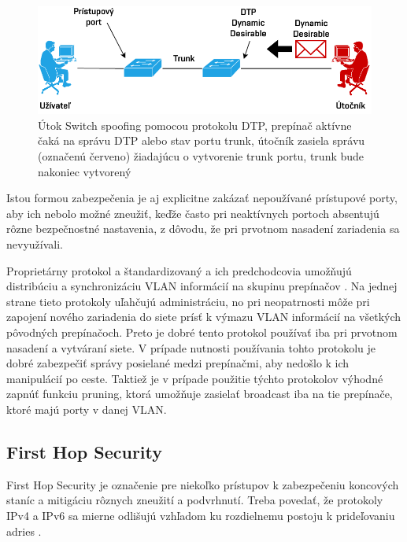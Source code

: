 \begin{figure}[H]
	\begin{center}
		\includegraphics[scale=0.75]{obrazky/switch-spoofing.pdf}
	\end{center}
	\caption[Útok Switch spoofing pomocou protokolu DTP]{Útok Switch spoofing pomocou protokolu DTP, prepínač aktívne čaká na správu DTP alebo stav portu trunk, útočník zasiela správu (označenú červeno) žiadajúcu o vytvorenie trunk portu, trunk bude nakoniec vytvorený}
	\label{fig:switch-spoofing}
\end{figure} 


Istou formou zabezpečenia je aj explicitne zakázať nepoužívané prístupové porty, aby ich nebolo možné zneužiť, keďže často pri neaktívnych portoch absentujú rôzne bezpečnostné nastavenia, z dôvodu, že pri prvotnom nasadení zariadenia sa nevyužívali.  

Proprietárny protokol  a štandardizovaný  a ich predchodcovia umožňujú distribúciu a synchronizáciu VLAN informácií na skupinu prepínačov \cite{Vyncke2008}. Na jednej strane tieto protokoly uľahčujú administráciu, no pri neopatrnosti môže pri zapojení nového zariadenia do siete prísť k výmazu VLAN informácií na všetkých pôvodných prepínačoch. Preto je dobré tento protokol používať iba pri prvotnom nasadení a vytváraní siete. V prípade nutnosti používania tohto protokolu je dobré zabezpečiť správy posielané medzi prepínačmi, aby nedošlo k ich manipulácií po ceste. Taktiež je v prípade použitie týchto protokolov výhodné zapnúť funkciu pruning, ktorá umožňuje zasielať broadcast iba na tie prepínače, ktoré majú porty v danej VLAN. 


\subsection*{First Hop Security}
First Hop Security je označenie pre niekoľko prístupov k zabezpečeniu koncových staníc a mitigáciu rôznych zneužití a podvrhnutí. Treba povedať, že protokoly IPv4 a IPv6 sa mierne odlišujú vzhľadom ku rozdielnemu postoju k prideľovaniu adries \cite{Satrapa2019}.

